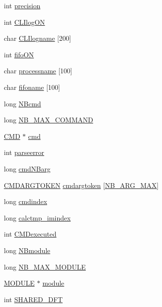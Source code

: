 \begin{DoxyCompactItemize}
int \hyperlink{structDATA_a7b6fce0fc9e6046ffa57b30b8bcd0d1f}{precision}
\item 
int \hyperlink{structDATA_abfc40a5bf0093716bcc793aca3ec678c}{C\+L\+Ilog\+O\+N}
\item 
char \hyperlink{structDATA_aa491474d93756c181862fb907c777b78}{C\+L\+Ilogname} \mbox{[}200\mbox{]}
\item 
int \hyperlink{structDATA_a37b44a7ef0d3d29f33bf3700ec28665e}{fifo\+O\+N}
\item 
char \hyperlink{structDATA_a58978653cfb98eaf9b9007cb992cc0e4}{processname} \mbox{[}100\mbox{]}
\item 
char \hyperlink{structDATA_ac3b98b39c316089481ab31820a1f4b21}{fifoname} \mbox{[}100\mbox{]}
\item 
long \hyperlink{structDATA_ab3ecb17b2561794d854efcbc47584b19}{N\+Bcmd}
\item 
long \hyperlink{structDATA_afc7d56480cf2e6f4b91ed95be0466d44}{N\+B\+\_\+\+M\+A\+X\+\_\+\+C\+O\+M\+M\+A\+N\+D}
\item 
\hyperlink{structCMD}{C\+M\+D} $\ast$ \hyperlink{structDATA_af0e58ce879fa3017d9131eed5a90cc96}{cmd}
\item 
int \hyperlink{structDATA_a04c14ba8ea1844e3f68888dca0fe3519}{parseerror}
\item 
long \hyperlink{structDATA_a6facd114f508ec4fcb52003b9f93d123}{cmd\+N\+Barg}
\item 
\hyperlink{structCMDARGTOKEN}{C\+M\+D\+A\+R\+G\+T\+O\+K\+E\+N} \hyperlink{structDATA_a1072fcd97dbe8660a3b3d7d54b21b300}{cmdargtoken} \mbox{[}\hyperlink{CLIcore_8h_a0a6b220d813ff622977cf6d7f1f5ffa6}{N\+B\+\_\+\+A\+R\+G\+\_\+\+M\+A\+X}\mbox{]}
\item 
long \hyperlink{structDATA_af462cdcbd42307c3dacf0891ba4dd8ca}{cmdindex}
\item 
long \hyperlink{structDATA_a11b6d226ab6612bc5a418abb89b56feb}{calctmp\+\_\+imindex}
\item 
int \hyperlink{structDATA_a51e21d55f2eeba8ae6c9f9f02311eeef}{C\+M\+Dexecuted}
\item 
long \hyperlink{structDATA_a4ef780e882fa0d3ad2462be54dc58f4e}{N\+Bmodule}
\item 
long \hyperlink{structDATA_aa3ce94f1c13e2a2b3acc31caca1f3b95}{N\+B\+\_\+\+M\+A\+X\+\_\+\+M\+O\+D\+U\+L\+E}
\item 
\hyperlink{structMODULE}{M\+O\+D\+U\+L\+E} $\ast$ \hyperlink{structDATA_a0a1527cfaff533ba10df8cfdf519002a}{module}
\item 
int \hyperlink{structDATA_a64d5b0ed5d5cedf11ff69ebf8d30dc20}{S\+H\+A\+R\+E\+D\+\_\+\+D\+F\+T}

\end{DoxyCompactItemize}

